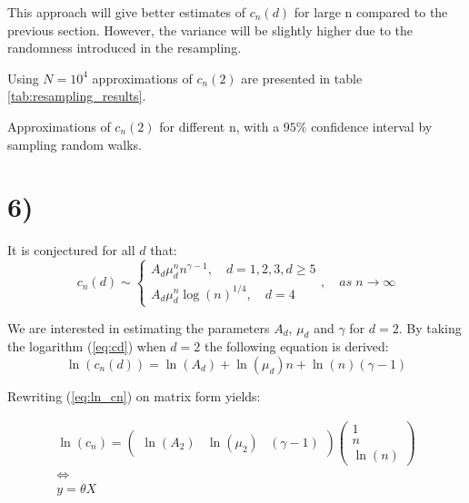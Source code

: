 \documentclass[a4paper]{article}
\begin{document}
This approach will give better estimates of $c_n(d)$ for large n compared to the previous section. However, the variance will be slightly higher due to the randomness introduced in the resampling.

Using $N = 10^4$ approximations of $c_n(2)$ are presented in table \ref{tab:resampling_results}.

\begin{table}[H]
    \centering
    \caption{Approximations of $c_n(2)$ for different n, with a $95\%$ confidence interval by sampling random walks.}
    \label{tab:resampling_results}
    
\end{table}

\section*{6)}

It is conjectured for all $d$ that:
\begin{equation}
    \label{eq:cd}
    c_n(d) \sim 
    \begin{cases}
        A_d\mu_d^nn^{\gamma-1}, \quad d = 1, 2, 3, d \geq 5 \\
        A_d\mu_d^n\log(n)^{1/4}, \quad d = 4
    \end{cases}, \quad as \; n \to \infty
\end{equation}

We are interested in estimating the parameters $A_d$, $\mu_d$ and $\gamma$ for $d = 2$.
By taking the logarithm (\ref{eq:cd}) when $d=2$ the following equation is derived:
\begin{equation}
    \ln(c_n(d)) =  \ln(A_d)+\ln(\mu_d)n+\ln(n)({\gamma-1})
    \label{eq:ln_cn}
\end{equation}

Rewriting (\ref{eq:ln_cn}) on matrix form yields:

\begin{equation}
    \begin{gathered}
        \ln(c_n)=
        \begin{pmatrix}
            \ln(A_2) & \ln(\mu_2) & (\gamma -1)
        \end{pmatrix}
        \begin{pmatrix}
            1 \\
            n \\
            \ln(n)
        \end{pmatrix}
        \\
        \iff
        \\
        y = \theta X
    \end{gathered}
\end{equation}
\end{document}
